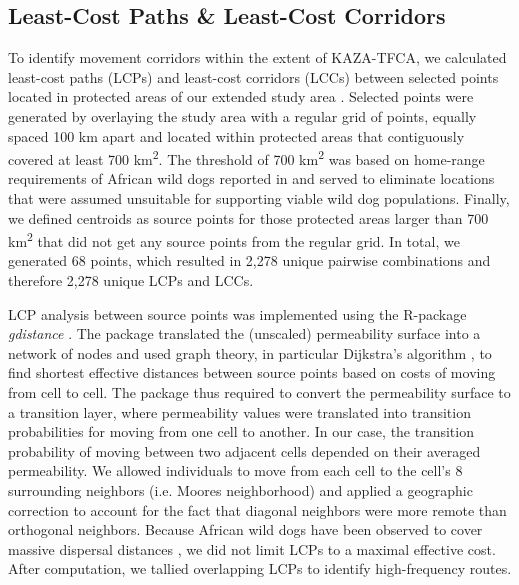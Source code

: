 \documentclass[abstract=on,10pt,a4paper,bibliography=totocnumbered]{scrartcl}
\begin{document}
\subsection{Least-Cost Paths \& Least-Cost Corridors}
To identify movement corridors within the extent of KAZA-TFCA, we calculated
least-cost paths (LCPs) and least-cost corridors (LCCs) between selected points
located in protected areas of our extended study area \citep{Adriaensen.2003,
Sawyer.2011}. Selected points were generated by overlaying the study area with a
regular grid of points, equally spaced 100 km apart and located within protected
areas that contiguously covered at least 700 km\textsuperscript{2}. The
threshold of 700 km\textsuperscript{2} was based on home-range requirements of
African wild dogs reported in \cite{Pomilia.2015} and served to eliminate
locations that were assumed unsuitable for supporting viable wild dog
populations. Finally, we defined centroids as source points for those protected
areas larger than 700 km\textsuperscript{2} that did not get any source points
from the regular grid. In total, we generated 68 points, which resulted in 2,278
unique pairwise combinations and therefore 2,278 unique LCPs and LCCs.

LCP analysis between source points was implemented using the R-package
\textit{gdistance} \citep{vanEtten.2018}. The package translated the (unscaled)
permeability surface into a network of nodes and used graph theory, in
particular Dijkstra's algorithm \citep{Dijkstra.1959}, to find shortest
effective distances between source points based on costs of moving from cell to
cell. The package thus required to convert the permeability surface to a
transition layer, where permeability values were translated into transition
probabilities for moving from one cell to another. In our case, the transition
probability of moving between two adjacent cells depended on their averaged
permeability. We allowed individuals to move from each cell to the cell's 8
surrounding neighbors (i.e. Moores neighborhood) and applied a geographic
correction to account for the fact that diagonal neighbors were more remote than
orthogonal neighbors. Because African wild dogs have been observed to cover
massive dispersal distances \citep{DaviesMostert.2012, Masenga.2016,
Cozzi.2020}, we did not limit LCPs to a maximal effective cost. After
computation, we tallied overlapping LCPs to identify high-frequency routes.
\end{document}
